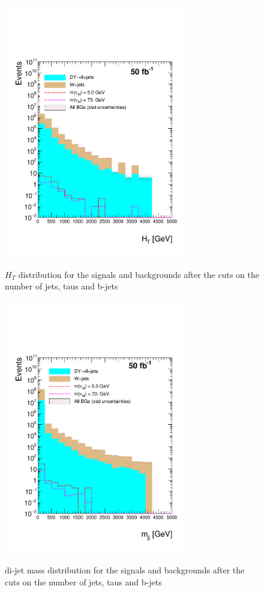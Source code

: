  \begin{figure}[h] 
 \centering
 \caption{$H_T$ distribution for the signals and backgrounds after the cuts on the number of jets, taus and b-jets}
 \includegraphics[width=0.7\textwidth]{./Capitulos/Analysis/AfterBJets/HT_MET_20} 
 \label{HT_bjets}
 \end{figure} 
 
  \begin{figure}[h] 
 \centering
 \caption{di-jet mass distribution for the signals and backgrounds after the cuts on the number of jets, taus and b-jets}
 \includegraphics[width=0.7\textwidth]{./Capitulos/Analysis/AfterBJets/mjj_MET_20} 
 \label{diJetMass_bjets}
 \end{figure} 
 
